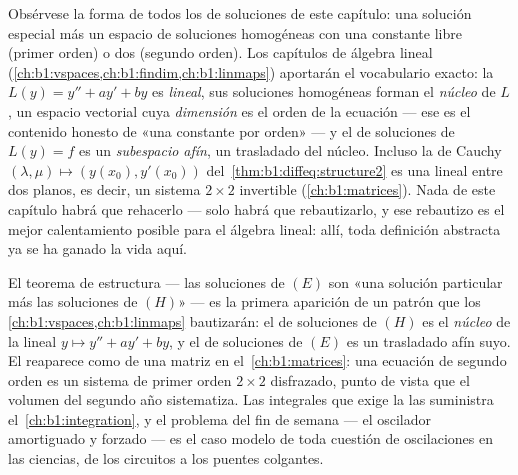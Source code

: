 \begin{remark}\label{rem:b1:diffeq:interlude}
Obsérvese la forma de todos los  de soluciones de este
capítulo: una solución especial más un espacio de soluciones homogéneas
con una constante libre (primer orden) o dos (segundo orden). Los
capítulos de álgebra lineal
(\cref{ch:b1:vspaces,ch:b1:findim,ch:b1:linmaps}) aportarán el
vocabulario exacto: la  $L(y) = y'' + ay' + by$ es
\emph{lineal}, sus soluciones homogéneas forman el \emph{núcleo} de
$L$, un espacio vectorial cuya \emph{dimensión} es el orden de la
ecuación --- ese es el contenido honesto de «una constante por orden»
--- y el  de soluciones de $L(y) = f$ es un \emph{subespacio
afín}, un trasladado del núcleo. Incluso la  de Cauchy
$(\lambda, \mu) \mapsto (y(x_0), y'(x_0))$
del~\cref{thm:b1:diffeq:structure2} es una  lineal entre dos
planos, es decir, un sistema $2 \times 2$ invertible
(\cref{ch:b1:matrices}). Nada de este capítulo habrá que rehacerlo ---
solo habrá que rebautizarlo, y ese rebautizo es el mejor
calentamiento posible para el álgebra lineal: allí, toda definición
abstracta ya se ha ganado la vida aquí.
\end{remark}

\begin{remark}\label{rem:b1:diffeq:whereused}
El teorema de estructura --- las soluciones de $(E)$ son «una solución
particular más las soluciones de $(H)$» --- es la primera aparición de
un patrón que los \cref{ch:b1:vspaces,ch:b1:linmaps} bautizarán: el
 de soluciones de $(H)$ es el \emph{núcleo} de la
 lineal $y \mapsto y'' + ay' + by$, y el  de
soluciones de $(E)$ es un trasladado afín suyo. El
 reaparece como 
de una matriz en el~\cref{ch:b1:matrices}: una ecuación de segundo
orden es un sistema de primer orden $2 \times 2$ disfrazado, punto de
vista que el volumen del segundo año sistematiza. Las integrales que
exige la  las suministra
el~\cref{ch:b1:integration}, y el problema del fin de semana --- el
oscilador amortiguado y forzado --- es el caso modelo de toda cuestión
de oscilaciones en las ciencias, de los circuitos a los puentes
colgantes.
\end{remark}

